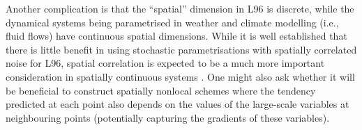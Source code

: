 \documentclass[../main.tex]{subfiles}
\begin{document}
Another complication is that the ``spatial'' dimension in L96 is discrete,
while the dynamical systems being parametrised in weather and climate modelling
(i.e., fluid flows) have continuous spatial dimensions. While it is well
established that there is little benefit in using stochastic parametrisations
with spatially correlated noise for L96, spatial correlation is expected to be
a much more important consideration in spatially continuous systems
\parencite{arnold2013}. One might also ask whether it will be beneficial to
construct spatially nonlocal schemes where the tendency predicted at each point
also depends on the values of the large-scale variables at neighbouring points
(potentially capturing the gradients of these variables).


\ifSubfilesClassLoaded{%
    \emergencystretch=5em
    \printbibliography{}
}{}
\end{document}
